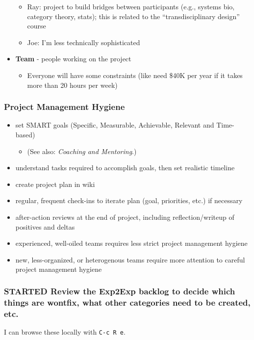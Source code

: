 \documentclass[11pt]{article}
\begin{document}
\begin{itemize}
\begin{itemize}
\item Ray: project to build bridges between participants (e.g., systems bio, category theory, stats); this is related to the “transdisciplinary design” course
\item Joe: I’m less technically sophisticated
\end{itemize}
\item \textbf{Team} - people working on the project
\begin{itemize}
\item Everyone will have some constraints (like need \$40K per year if it takes more than 20 hours per week)
\end{itemize}
\end{itemize}

\subsubsection{Project Management Hygiene}
\label{sec:org376a52a}

\begin{itemize}
\item set SMART goals (Specific, Measurable, Achievable, Relevant and Time-based)
\begin{itemize}
\item (See also: \emph{Coaching and Mentoring}.)
\end{itemize}
\item understand tasks required to accomplish goals, then set realistic timeline
\item create project plan in wiki
\item regular, frequent check-ins to iterate plan (goal, priorities, etc.) if necessary
\item after-action reviews at the end of project, including reflection/writeup of positives and deltas
\item experienced, well-oiled teams requires less strict project management hygiene
\item new, less-organized, or heterogenous teams require more attention to careful project management hygiene
\end{itemize}

\subsubsection{{\bfseries\sffamily STARTED} Review the Exp2Exp backlog to decide which things are wontfix, what other categories need to be created, etc.}
\label{sec:org4eb1b4b}
I can browse these locally with \texttt{C-c R e}.
\end{document}

